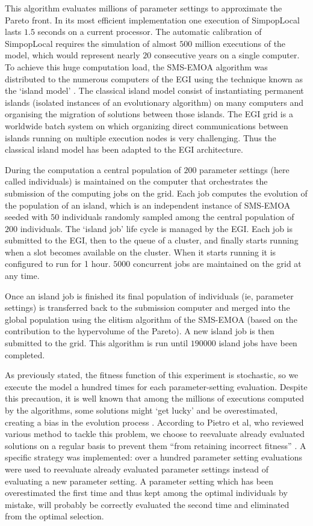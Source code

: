 This algorithm evaluates millions of parameter settings to approximate the Pareto front. In its most efficient implementation one execution of SimpopLocal lasts $1.5$ seconds on a current processor. The automatic calibration of SimpopLocal requires the simulation of almost $500$ million executions of the model, which would represent nearly $20$ consecutive years on a single computer. To achieve this huge computation load, the SMS-EMOA algorithm was distributed to the numerous computers of the EGI using the technique known as the ‘island model’ \autocites{Emmerich2005,Whitley1997}. The classical island model consist of instantiating permanent islands (isolated instances of an evolutionary algorithm) on many computers and organising the migration of solutions between those islands. The EGI grid is a worldwide batch system on which organizing direct communications between islands running on multiple execution nodes is very challenging. Thus the classical island model has been adapted to the EGI architecture.

During the computation a central population of $200$ parameter settings (here called individuals) is maintained on the computer that orchestrates the submission of the computing jobs on the grid. Each job computes the evolution of the population of an island, which is an independent instance of SMS-EMOA seeded with $50$ individuals randomly sampled among the central population of $200$ individuals. The ‘island job’ life cycle is managed by the EGI. Each job is submitted to the EGI, then to the queue of a cluster, and finally starts running when a slot becomes available on the cluster. When it starts running it is configured to run for 1 hour. $5000$ concurrent jobs are maintained on the grid at any time.

Once an island job is finished its final population of individuals (ie, parameter settings) is transferred back to the submission computer and merged into the global population using the elitism algorithm of the SMS-EMOA (based on the contribution to the hypervolume of the Pareto). A new island job is then submitted to the grid. This algorithm is run until $\num{190000}$ island jobs have been completed.

As previously stated, the fitness function of this experiment is stochastic, so we execute the model a hundred times for each parameter-setting evaluation. Despite this precaution, it is well known that among the millions of executions computed by the algorithms, some solutions might ‘get lucky’ and be overestimated, creating a bias in the evolution process \autocite{Pietro2004}. According to Pietro et al, who reviewed various method to tackle this problem, we choose to reevaluate already evaluated solutions on a regular basis to prevent them “from retaining incorrect fitness” \autocite[2]{Pietro2004}. A specific strategy was implemented: over a hundred parameter setting evaluations were used to reevaluate already evaluated parameter settings instead of evaluating a new parameter setting. A parameter setting which has been overestimated the first time and thus kept among the optimal individuals by mistake, will probably be correctly evaluated the second time and eliminated from the optimal selection.


